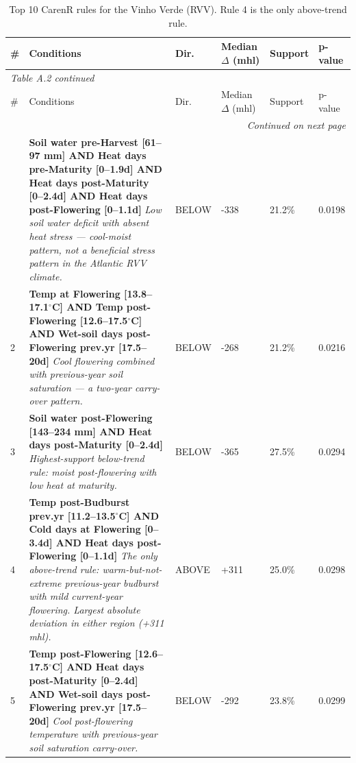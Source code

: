 {\small
\begin{longtable}{p{0.4cm}|p{8.5cm}|>{\centering\arraybackslash}p{0.9cm}|p{1.3cm}|p{1.2cm}|p{1.2cm}}
  \caption{Top 10 CarenR rules for the Vinho Verde (RVV). Rule 4 is the only above-trend rule.}\label{tab:appa_top10_rvv}\\
  \toprule
  \# & Conditions & Dir. & Median $\Delta$ \newline (mhl) & Support & p-value \\
  \midrule
  \endfirsthead
  \multicolumn{6}{l}{\small\textit{Table A.2 continued}}\\
  \toprule
  \# & Conditions & Dir. & Median $\Delta$ (mhl) & Support & p-value \\
  \midrule
  \endhead
  \midrule
  \multicolumn{6}{r}{\small\textit{Continued on next page}}\\
  \endfoot
  \bottomrule
  \endlastfoot
  1 & \textbf{Soil water pre-Harvest [61--97 mm] AND Heat days pre-Maturity [0--1.9d] AND Heat days post-Maturity [0--2.4d] AND Heat days post-Flowering [0--1.1d]} \newline \textit{Low soil water deficit with absent heat stress — cool-moist pattern, not a beneficial stress pattern in the Atlantic RVV climate.} & {\footnotesize BELOW} & -338 & 21.2\% & 0.0198 \\
  2 & \textbf{Temp at Flowering [13.8--17.1$^\circ$C] AND Temp post-Flowering [12.6--17.5$^\circ$C] AND Wet-soil days post-Flowering prev.yr [17.5--20d]} \newline \textit{Cool flowering combined with previous-year soil saturation — a two-year carry-over pattern.} & {\footnotesize BELOW} & -268 & 21.2\% & 0.0216 \\
  3 & \textbf{Soil water post-Flowering [143--234 mm] AND Heat days post-Maturity [0--2.4d]} \newline \textit{Highest-support below-trend rule: moist post-flowering with low heat at maturity.} & {\footnotesize BELOW} & -365 & 27.5\% & 0.0294 \\
  4 & \textbf{Temp post-Budburst prev.yr [11.2--13.5$^\circ$C] AND Cold days at Flowering [0--3.4d] AND Heat days post-Flowering [0--1.1d]} \newline \textit{The only above-trend rule: warm-but-not-extreme previous-year budburst with mild current-year flowering. Largest absolute deviation in either region (+311 mhl).} & {\footnotesize ABOVE} & +311 & 25.0\% & 0.0298 \\
  5 & \textbf{Temp post-Flowering [12.6--17.5$^\circ$C] AND Heat days post-Maturity [0--2.4d] AND Wet-soil days post-Flowering prev.yr [17.5--20d]} \newline \textit{Cool post-flowering temperature with previous-year soil saturation carry-over.} & {\footnotesize BELOW} & -292 & 23.8\% & 0.0299 \\

\end{longtable}}
